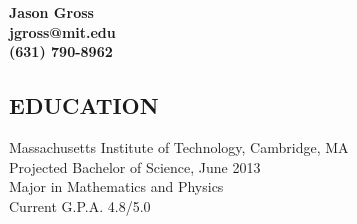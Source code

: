 \documentclass{res}
\begin{document}
 \fontsize{11pt}{12pt}\selectfont

\begin{center}
  \LARGE \bf Jason Gross \\
  \large jgross@mit.edu \\
  \large (631) 790-8962
\end{center}

\address{\bf  PRESENT ADDRESS\\3 Ames Street, Box \# 99\\Cambridge, MA 02142}
\address{\bf PERMANENT ADDRESS \\ 126 Hayrick Lane \\  Commack, NY 11725}
                                  
\begin{resume}

 
\section{EDUCATION}          
    Massachusetts Institute of Technology, Cambridge, MA  \\        
    Projected Bachelor of Science, June 2013   \\       
    Major in Mathematics and Physics       \\   
    Current G.P.A. 4.8/5.0          

 

\end{resume}
\end{document}
